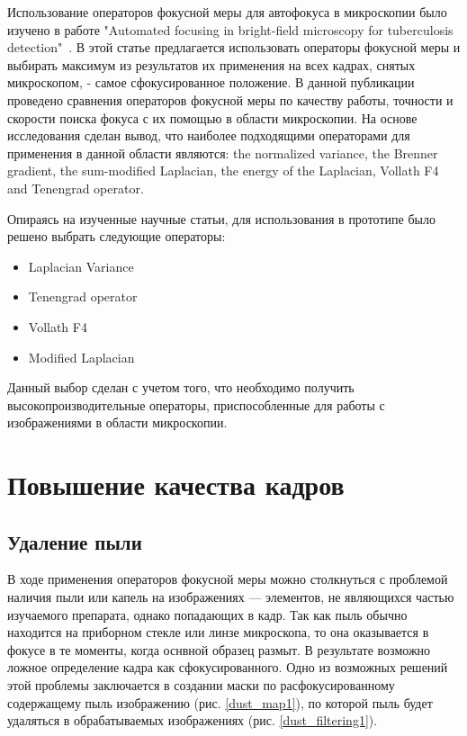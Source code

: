 \documentclass[14pt]{matmex-diploma-custom}
\begin{document}
Использование операторов фокусной меры для автофокуса в микроскопии было изучено в работе "Automated focusing in bright-field microscopy for tuberculosis detection"~\cite{BestOperators}. В этой статье предлагается использовать операторы фокусной меры и выбирать максимум из результатов их применения на всех кадрах, снятых микроскопом, - самое сфокусированное положение. В данной публикации проведено сравнения операторов фокусной меры по качеству работы, точности и скорости поиска фокуса с их помощью в области микроскопии. На основе исследования сделан вывод, что наиболее подходящими операторами для применения в данной области являются: the normalized variance, the Brenner gradient, the sum-modified Laplacian, the energy of the Laplacian, Vollath F4 and Tenengrad operator.

Опираясь на изученные научные статьи, для использования в прототипе было решено выбрать следующие операторы:
\begin{itemize}
    \item Laplacian Variance 
    \item Tenengrad operator
    \item Vollath F4
    \item Modified Laplacian
\end{itemize}
Данный выбор сделан с учетом того, что необходимо получить высокопроизводительные операторы, приспособленные для работы с изображениями в области микроскопии.

\section{Повышение качества кадров}
\subsection{Удаление пыли}

В ходе применения операторов фокусной меры можно столкнуться с проблемой наличия пыли или капель на изображениях --- элементов, не являющихся частью изучаемого препарата, однако попадающих в кадр. Так как пыль обычно находится на приборном стекле или линзе микроскопа, то она оказывается в фокусе в те моменты, когда оснвной образец размыт. В результате возможно ложное определение кадра как сфокусированного. Одно из возможных решений этой проблемы заключается в создании  маски по расфокусированному содержащему пыль изображению (рис. \ref{dust_map1}), по которой пыль будет удаляться в обрабатываемых изображениях (рис. \ref{dust_filtering1}).
\end{document}
